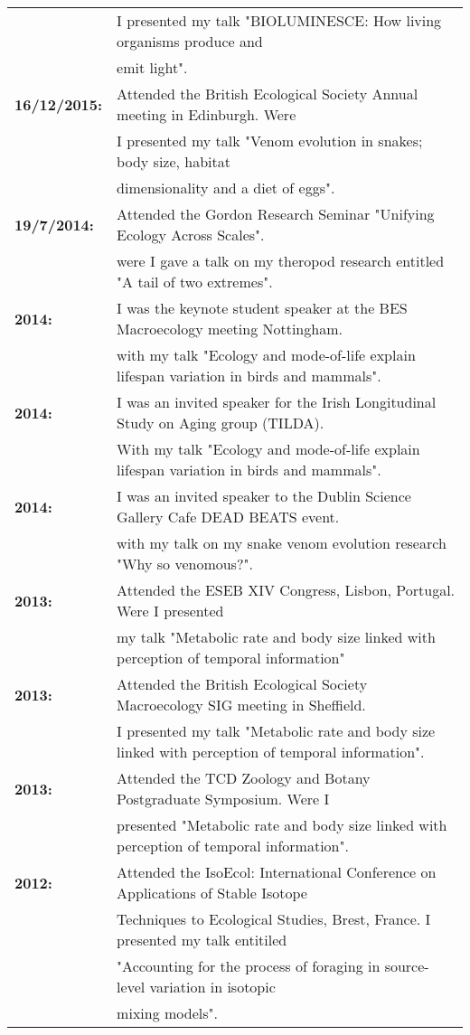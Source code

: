 \documentclass[10pt,a4paper]{article}
\begin{document}
\begin{tabular}{ll}
& I presented my talk "BIOLUMINESCE: How living organisms produce and\\ 
& emit light".\\
\textbf{16/12/2015:} & Attended the British Ecological Society Annual meeting in Edinburgh. Were\\ 
& I presented my talk "Venom evolution in snakes; body size, habitat\\
& dimensionality and a diet of eggs".\\
\textbf{19/7/2014:} & Attended the Gordon Research Seminar "Unifying Ecology Across Scales".\\ 
& were I gave a talk on my theropod research entitled "A tail of two extremes".\\
\textbf{2014:} & I was the keynote student speaker at the BES Macroecology meeting Nottingham.\\ 
& with my talk "Ecology and mode-of-life explain lifespan variation in birds and mammals".\\
\textbf{2014:} & I was an invited speaker for the Irish Longitudinal Study on Aging group (TILDA).\\ 
& With my talk "Ecology and mode-of-life explain lifespan variation in birds and mammals".\\
\textbf{2014:} & I was an invited speaker to the Dublin Science Gallery Cafe DEAD BEATS event.\\ 
& with my talk on my snake venom evolution research "Why so venomous?".\\
\textbf{2013:} & Attended the ESEB XIV Congress, Lisbon, Portugal. Were I presented\\
& my talk "Metabolic rate and body size linked with perception of temporal information"\\
\textbf{2013:} & Attended the British Ecological Society Macroecology SIG meeting in Sheffield.\\
& I presented my talk "Metabolic rate and body size linked with perception of temporal information".\\
\textbf{2013:} & Attended the TCD Zoology and Botany Postgraduate Symposium. Were I\\
& presented "Metabolic rate and body size linked with perception of temporal information".\\
\textbf{2012:} & Attended the IsoEcol: International Conference on Applications of Stable Isotope\\
&Techniques to Ecological Studies, Brest, France. I presented my talk entitiled\\
&"Accounting for the process of foraging in source-level variation in isotopic\\
& mixing models".\\


\end{tabular}
\end{document}

